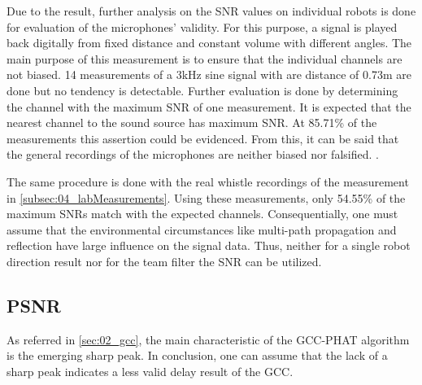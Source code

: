 Due to the result, further analysis on the \ac{SNR} values
on individual robots is done for evaluation of the microphones' validity.
For this purpose, a signal is played back digitally from fixed distance
and constant volume with different angles.
The main purpose of this measurement is to ensure that the individual channels
are not biased.
14 measurements of a 3\si{\kilo\hertz} sine signal
with are distance of 0.73\si{m} are done but no tendency is detectable.
Further evaluation is done by determining the channel with the maximum
\ac{SNR} of one measurement.
It is expected that the nearest channel to the sound source has maximum \ac{SNR}.
At 85.71\si{\percent} of the measurements this assertion could be
evidenced.
From this, it can be said that the general recordings of the microphones
are neither biased nor falsified.
.

The same procedure is done with the real whistle recordings of the
measurement in \cref{subsec:04_labMeasurements}.
Using these measurements, only 54.55\si{\percent} of the maximum \acp{SNR}
match with the expected channels.
Consequentially, one must assume that the environmental circumstances
like multi-path propagation and reflection have large influence
on the signal data.
Thus, neither for a single robot direction result nor for the team filter
the \ac{SNR} can be utilized.

\subsection{PSNR}
\label{subsec:04_psnr}

As referred in \cref{sec:02_gcc}, the main characteristic of the \ac{GCC-PHAT}
algorithm is the emerging sharp peak.
In conclusion, one can assume that the lack of a sharp peak indicates
a less valid delay result of the \ac{GCC}.

